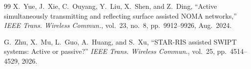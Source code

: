 \documentclass[journal]{IEEEtran}
\begin{document}
\begin{thebibliography}{99}
X.~Yue, J.~Xie, C.~Ouyang, Y.~Liu, X.~Shen, and Z.~Ding,
``Active simultaneously transmitting and reflecting surface assisted NOMA networks,''
\emph{IEEE Trans. Wireless Commun.}, vol.~23, no.~8, pp.~9912--9926, Aug.~2024.

G.~Zhu, X.~Mu, L.~Guo, A.~Huang, and S.~Xu,
``STAR-RIS assisted SWIPT systems: Active or passive?''
\emph{IEEE Trans. Wireless Commun.}, vol.~25, pp.~4514--4529, 2026.

\end{thebibliography}
\endgroup
\end{document}
